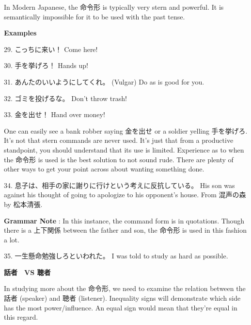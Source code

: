 \par{ In Modern Japanese, the 命令形 is typically very stern and powerful. It is semantically impossible for it to be used with the past tense. }

\begin{center}
\textbf{Examples }
\end{center}

\par{29. こっちに来い！ \hfill\break
Come here! }

\par{30. 手を挙げろ！ \hfill\break
Hands up! }

\par{31. あんたのいいようにしてくれ。 (Vulgar) \hfill\break
Do as is good for you. }

\par{32. ゴミを投げるな。 \hfill\break
Don't throw trash! }

\par{33. 金を出せ！ \hfill\break
Hand over money! }

\par{ One can easily see a bank robber saying 金を出せ or a soldier yelling 手を挙げろ. It's not that stern commands are never used. It's just that from a productive standpoint, you should understand that its use is limited. Experience as to when the 命令形 is used is the best solution to not sound rude. There are plenty of other ways to get your point across about wanting something done. }

\par{34. 息子は、相手の家に謝りに行けという考えに反抗している。 \hfill\break
His son was against his thought of going to apologize to his opponent's house. \hfill\break
From 混声の森 by 松本清張. }

\par{\textbf{Grammar Note }: In this instance, the command form is in quotations. Though there is a 上下関係 between the father and son, the 命令形 is used in this fashion a lot. }

\par{35. 一生懸命勉強しろといわれた。 \hfill\break
I was told to study as hard as possible.  }

\begin{center}
 \textbf{話者　VS 聴者 }
\end{center}

\par{ In studying more about the 命令形, we need to examine the relation between the 話者 (speaker) and 聴者 (listener). Inequality signs will demonstrate which side has the most power\slash influence. An equal sign would mean that they're equal in this regard. }

